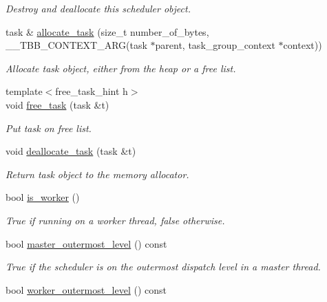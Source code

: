 \begin{DoxyCompactItemize}
\begin{DoxyCompactList}\small\item\em Destroy and deallocate this scheduler object. \end{DoxyCompactList}\item 
task \& \hyperlink{classtbb_1_1internal_1_1generic__scheduler_aa0d316e9f3063c6b57fa21e0716d4d77}{allocate\+\_\+task} (size\+\_\+t number\+\_\+of\+\_\+bytes, \+\_\+\+\_\+\+T\+B\+B\+\_\+\+C\+O\+N\+T\+E\+X\+T\+\_\+\+A\+R\+G(task $\ast$parent, task\+\_\+group\+\_\+context $\ast$context))
\begin{DoxyCompactList}\small\item\em Allocate task object, either from the heap or a free list. \end{DoxyCompactList}\item 
{\footnotesize template$<$free\+\_\+task\+\_\+hint h$>$ }\\void \hyperlink{classtbb_1_1internal_1_1generic__scheduler_a12dd37171af77214add72a973e6b71ba}{free\+\_\+task} (task \&t)
\begin{DoxyCompactList}\small\item\em Put task on free list. \end{DoxyCompactList}\item 
\hypertarget{classtbb_1_1internal_1_1generic__scheduler_ad965858a5e7cb5574926d8d1692063b5}{}void \hyperlink{classtbb_1_1internal_1_1generic__scheduler_ad965858a5e7cb5574926d8d1692063b5}{deallocate\+\_\+task} (task \&t)\label{classtbb_1_1internal_1_1generic__scheduler_ad965858a5e7cb5574926d8d1692063b5}

\begin{DoxyCompactList}\small\item\em Return task object to the memory allocator. \end{DoxyCompactList}\item 
\hypertarget{classtbb_1_1internal_1_1generic__scheduler_af64d15a434f12a7fbfd46910813ea59f}{}bool \hyperlink{classtbb_1_1internal_1_1generic__scheduler_af64d15a434f12a7fbfd46910813ea59f}{is\+\_\+worker} ()\label{classtbb_1_1internal_1_1generic__scheduler_af64d15a434f12a7fbfd46910813ea59f}

\begin{DoxyCompactList}\small\item\em True if running on a worker thread, false otherwise. \end{DoxyCompactList}\item 
bool \hyperlink{classtbb_1_1internal_1_1generic__scheduler_a84fe7450cc14ca226340cf8bffd379c7}{master\+\_\+outermost\+\_\+level} () const 
\begin{DoxyCompactList}\small\item\em True if the scheduler is on the outermost dispatch level in a master thread. \end{DoxyCompactList}\item 
\hypertarget{classtbb_1_1internal_1_1generic__scheduler_a4e7eff5365d63114c100e0a490e04884}{}bool \hyperlink{classtbb_1_1internal_1_1generic__scheduler_a4e7eff5365d63114c100e0a490e04884}{worker\+\_\+outermost\+\_\+level} () const \label{classtbb_1_1internal_1_1generic__scheduler_a4e7eff5365d63114c100e0a490e04884}


\end{DoxyCompactItemize}
